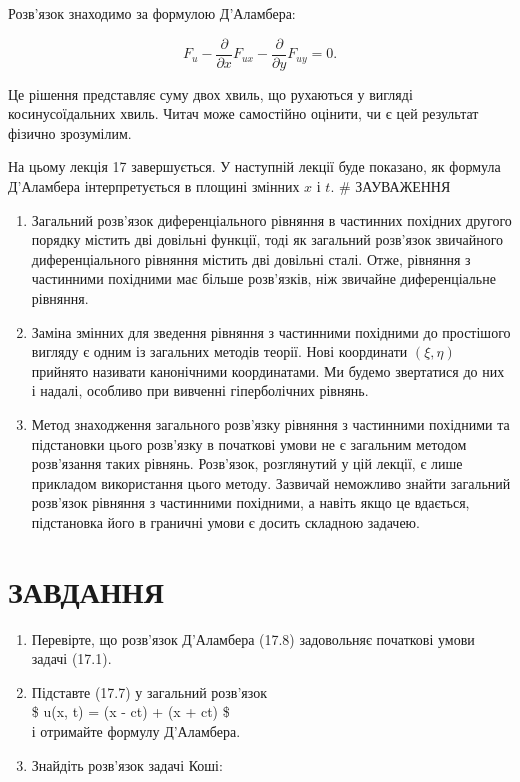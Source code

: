 \documentclass[
  ukrainian,
]{article}
\begin{document}
Розв'язок знаходимо за формулою Д'Аламбера:

\[
F_u - \frac{\partial}{\partial x}F_{ux} - \frac{\partial}{\partial y}F_{uy} = 0.
\]

Це рішення представляє суму двох хвиль, що рухаються у вигляді
косинусоїдальних хвиль. Читач може самостійно оцінити, чи є цей
результат фізично зрозумілим.

На цьому лекція 17 завершується. У наступній лекції буде показано, як
формула Д'Аламбера інтерпретується в площині змінних \(x\) і \(t\). \#
ЗАУВАЖЕННЯ

\begin{enumerate}
\def\labelenumi{\arabic{enumi}.}
\item
  Загальний розв'язок диференціального рівняння в частинних похідних
  другого порядку містить дві довільні функції, тоді як загальний
  розв'язок звичайного диференціального рівняння містить дві довільні
  сталі. Отже, рівняння з частинними похідними має більше розв'язків,
  ніж звичайне диференціальне рівняння.
\item
  Заміна змінних для зведення рівняння з частинними похідними до
  простішого вигляду є одним із загальних методів теорії. Нові
  координати \((\xi, \eta)\) прийнято називати канонічними координатами.
  Ми будемо звертатися до них і надалі, особливо при вивченні
  гіперболічних рівнянь.
\item
  Метод знаходження загального розв'язку рівняння з частинними похідними
  та підстановки цього розв'язку в початкові умови не є загальним
  методом розв'язання таких рівнянь. Розв'язок, розглянутий у цій
  лекції, є лише прикладом використання цього методу. Зазвичай неможливо
  знайти загальний розв'язок рівняння з частинними похідними, а навіть
  якщо це вдається, підстановка його в граничні умови є досить складною
  задачею.
\end{enumerate}

\section{ЗАВДАННЯ}\label{ux437ux430ux432ux434ux430ux43dux43dux44f-12}

\begin{enumerate}
\def\labelenumi{\arabic{enumi}.}
\item
  Перевірте, що розв'язок Д'Аламбера (17.8) задовольняє початкові умови
  задачі (17.1).
\item
  Підставте (17.7) у загальний розв'язок\\
  \$ u(x, t) = \psi(x - ct) + \psi(x + ct) \$\\
  і отримайте формулу Д'Аламбера.
\item
  Знайдіть розв'язок задачі Коші:
\end{enumerate}
\end{document}
